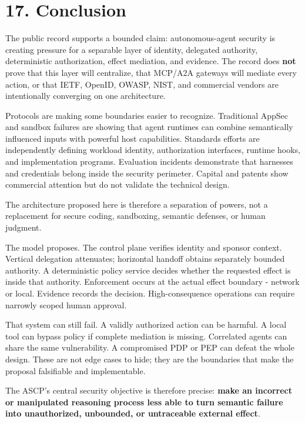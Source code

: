 \documentclass[
  10pt,
  letterpaper,
]{article}
\begin{document}
\section{17. Conclusion}\label{conclusion}

The public record supports a bounded claim: autonomous-agent security is
creating pressure for a separable layer of identity, delegated
authority, deterministic authorization, effect mediation, and evidence.
The record does \textbf{not} prove that this layer will centralize, that
MCP/A2A gateways will mediate every action, or that IETF, OpenID, OWASP,
NIST, and commercial vendors are intentionally converging on one
architecture.

Protocols are making some boundaries easier to recognize. Traditional
AppSec and sandbox failures are showing that agent runtimes can combine
semantically influenced inputs with powerful host capabilities.
Standards efforts are independently defining workload identity,
authorization interfaces, runtime hooks, and implementation programs.
Evaluation incidents demonstrate that harnesses and credentials belong
inside the security perimeter. Capital and patents show commercial
attention but do not validate the technical design.

The architecture proposed here is therefore a separation of powers, not
a replacement for secure coding, sandboxing, semantic defenses, or human
judgment.

The model proposes. The control plane verifies identity and sponsor
context. Vertical delegation attenuates; horizontal handoff obtains
separately bounded authority. A deterministic policy service decides
whether the requested effect is inside that authority. Enforcement
occurs at the actual effect boundary - network or local. Evidence
records the decision. High-consequence operations can require narrowly
scoped human approval.

That system can still fail. A validly authorized action can be harmful.
A local tool can bypass policy if complete mediation is missing.
Correlated agents can share the same vulnerability. A compromised PDP or
PEP can defeat the whole design. These are not edge cases to hide; they
are the boundaries that make the proposal falsifiable and implementable.

The ASCP's central security objective is therefore precise: \textbf{make
an incorrect or manipulated reasoning process less able to turn semantic
failure into unauthorized, unbounded, or untraceable external effect}.
\end{document}

